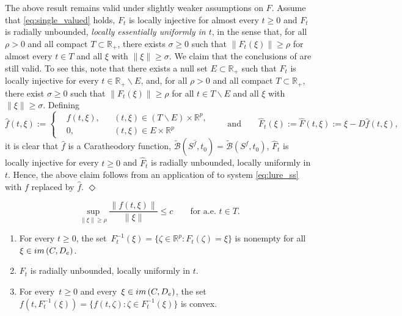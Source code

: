 \documentclass[10pt,a4paper]{amsart}
\newcommand{\R}{\mathbb R}
\newcommand{\sB}{{\mathcal B}}
\begin{document}
\begin{remark}\label{rem:a.e.}
\begin{rm}
The above result remains valid under slightly weaker assumptions on $F$. Assume that \eqref{eq:single_valued} holds, $F_t$ is locally injective for almost every $t\geq 0$
and $F_t$ is radially unbounded, {\it locally essentially uniformly in $t$}, in the sense
that, for all $\rho>0$ and all compact $T\subset\R_+$, there exists $\sigma\geq 0$ such that $\|F_t(\xi)\|\geq\rho$ for almost every $t\in T$ and all $\xi$ with $\|\xi\|\geq\sigma$.
We claim that the conclusions of 
are still valid. To see this, note that there exists a null set $E\subset\R_+$ such that
$F_t$ is locally injective for every $t\in\R_+\backslash E$, and, for all $\rho>0$ and all compact $T\subset\R_+$, there exist $\sigma\geq 0$ such that $\|F_t(\xi)\|\geq\rho$ for all $t\in T\backslash E$ and all $\xi$ with $\|\xi\|\geq\sigma$. Defining
\[
\hat f(t,\xi):=\left\{ \begin{aligned} & f(t,\xi), & & (t,\xi)\in(T\backslash E)\times\R^p, \\
& 0, & & (t,\xi)\in E\times\R^p
\end{aligned}\right.\qquad\mbox{and}\qquad
\hat F_t(\xi):=\hat F(t,\xi):=\xi-D\hat f(t,\xi),
\]
it is clear that $\hat f$ is a Caratheodory function, $\tilde\sB(S^{\hat f},t_0)=
\tilde\sB(S^f,t_0)$, $\hat F_t$ is locally injective
for every $t\geq 0$ and $\hat F_t$ is radially unbounded, locally uniformly in $t$. Hence, the above claim follows from an application of  to system \eqref{eq:lure_ss} with $f$ replaced by $\hat f$.
\hfill$\Diamond$
\end{rm}
\end{remark}

\begin{equation}\label{eq:al_bound}
\sup_{\|\xi\|\geq\rho}\frac{\|f(t,\xi)\|}{\|\xi\|}\leq c\qquad\mbox{for a.e. $t\in T$}.
\end{equation}

\begin{enumerate}[label = {\bfseries (A\arabic*)}, ref = {\rm (A\arabic*)}]
%
\item \label{ls:a1} For every $t\geq 0$, the set~$F_t^{-1}(\xi)=\{\zeta\in\R^p:F_t(\zeta)=\xi\}$ is nonempty for all $\xi\in{\rm im}\,(C,D_{\rm e})$.
%
\item \label{ls:a2} $F_t$ is radially unbounded, locally uniformly in $t$.
%
\item \label{ls:a3} For every~$t\geq 0$ and every~$\xi\in {\rm im}\,(C,D_{\rm e})$, the set~$f(t,F_t^{-1}(\xi))=\{f(t,\zeta):\zeta\in F_t^{-1}(\xi)\}$ is convex.

\end{enumerate}
\end{document}
